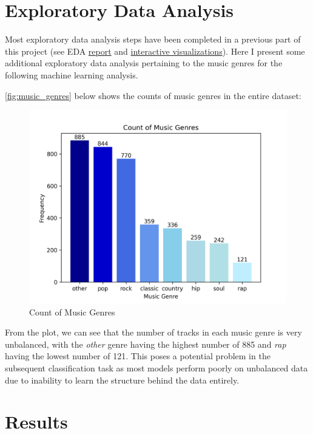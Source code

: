 \documentclass{article}
\begin{document}
\section{Exploratory Data Analysis}

Most exploratory data analysis steps have been completed in a previous part of this project (see EDA \href{https://github.com/BullDF/billboard-songs-analysis-with-spotify/blob/main/EDA/report.pdf}{report} and \href{https://bulldf.github.io/billboard-songs-analysis-with-spotify/EDA.html}{interactive visualizations}). Here I present some additional exploratory data analysis pertaining to the music genres for the following machine learning analysis.

\autoref*{fig:music_genres} below shows the counts of music genres in the entire dataset:

\begin{figure}[htbp]
    \centering
    \includegraphics[width=15cm]{count_of_music_genres.png}
    \caption{Count of Music Genres}
    \label{fig:music_genres}
\end{figure}

From the plot, we can see that the number of tracks in each music genre is very unbalanced, with the \textit{other} genre having the highest number of 885 and \textit{rap} having the lowest number of 121. This poses a potential problem in the subsequent classification task as most models perform poorly on unbalanced data due to inability to learn the structure behind the data entirely.

\section{Results}
\end{document}
